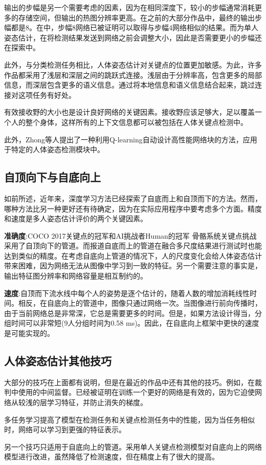 \documentclass[hyperref]{ctexart}
\begin{document}
\begin{multicols}{2}
		输出的步幅是另一个需要考虑的因素，因为在相同深度下，较小的步幅通常消耗更多的存储空间，但输出的热图分辨率更高。在之前的大部分作品中，最终的输出步幅都是8。在\cite{newell2017associative}中，步幅8网络已被证明可以取得与步幅4网络相似的结果。而\cite{newell2017associative}为单人姿态估计，在将检测结果发送到网络之前会调整大小，因此是否需要更小的步幅还在探索中。
		
		此外，与分类检测任务相比，人体姿态估计对关键点的位置更加敏感。为此，许多作品\cite{newell2017associative}\cite{zhu2017multi}都采用了浅层和深层之间的跳跃式连接。浅层由于分辨率高，包含更多的局部信息，而深层包含更多的语义信息。通过将本地信息和语义信息结合起来，跳过连接对这项任务有好处。
		
		有效接收野的大小也是设计良好网络的关键因素。接收野应该足够大，足以覆盖一个人的整个身体，这样所有的上下文信息都可以被包括在人体关键点检测中\cite{newell2017associative}\cite{zhu2017multi}。
		
		此外，Zhong等人\cite{zhong2018practical}提出了一种利用Q-learning自动设计高性能网络块的方法，应用于特定的人体姿态检测模块中。
		\subsection{自顶向下与自底向上}
		如前所述，近年来，深度学习方法已经探索了自底而上和自顶而下的方法。然而，哪种方法比另一种更好还有待确定，因为在实际应用程序中要考虑多个方面。精度和速度是多人姿态估计评价的两个关键因素。
		
		\textbf{准确度}:COCO 2017关键点的冠军\cite{DBLP:conf/cvpr/CaoSWS17}和AI挑战者Human的冠军\cite{chen2018cascaded}
		骨骼系统关键点挑战采用了自顶向下的管道。而\cite{newell2017associative}报道自底而上的管道在融合多尺度结果进行测试时也能达到类似的精度。在考虑自底向上管道的情况下，人的尺度变化会给人体姿态估计带来困难，因为网络无法从图像中学习到一致的特征。另一个需要注意的事实是，输出特征图分辨率和网络容量是相互制约的。
		
		\textbf{速度}:自顶而下流水线中每个人的姿势是逐个估计的，随着人数的增加消耗线性时间。相反，在自底向上的管道中，图像只通过网络一次。当图像进行前向传播时，由于当前网络总是非常深，它总是需要更多的时间。但是，如果方法设计得当，分组时间可以非常短(9人分组时间为0.58 ms)。因此，在自底向上框架中更快的速度是可能实现的。
		\subsection{人体姿态估计其他技巧}
		大部分的技巧在上面都有说明，但是在最近的作品中还有其他的技巧。例如，在裁判中使用的中间监督。\cite{zhu2017multi}已经被证明在训练一个更好的网络是有效的，因为它迫使网络从较浅的层学习特征，并防止消失的梯度。
		
		多任务学习提高了模型在检测任务\cite{ren2015faster}和关键点检测任务中的性能，因为当任务相似时，网络可以学习到更强的特征表示。
		
		另一个技巧只适用于自底向上的管道。采用单人关键点检测模型对自底向上的网络模型进行改进，虽然降低了检测速度，但在精度上有了很大的提高。
	\end{multicols}
\end{document}
